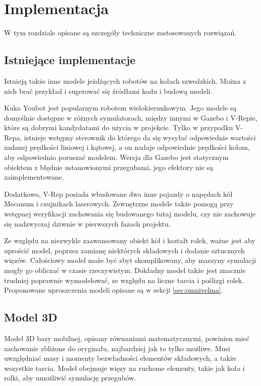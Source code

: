 \chapter{Implementacja} 
\label{sec:implementation}
W tym rozdziale opisane są szczegóły techniczne zastosowanych rozwiązań.

\section{Istniejące implementacje}
	Istnieją także inne modele jeżdżących robotów na kołach szwedzkich.
	Można z nich brać przykład i sugerować się źródłami kodu i budową modeli.

	Kuka Youbot jest popularnym robotem wielokierunkowym. Jego modele są domyślnie dostępne w różnych symulatorach, między innymi w Gazebo i V-Repie, które są dobrymi kandydatami do 
	użycia w projekcie. Tylko w przypadku V-Repa, istnieje wstępny sterownik do którego da się wysyłać odpowiednie wartości zadanej prędkości liniowej i kątowej, a on nadaje odpowiednie prędkości kołom, aby odpowiednio poruszać modelem.
	Wersja dla Gazebo jest statycznym obiektem z błędnie ustanowionymi przegubami, jego efektory nie są zaimplementowane.
	
	Dodatkowo, V-Rep posiada wbudowane dwa inne pojazdy o napędach kół Mecanum i czujnikach laserowych.
	Zewnętrzne modele także pomogą przy wstępnej weryfikacji zachowania się budowanego tutaj modelu, czy nie zachowuje się nadzwyczaj dziwnie w pierwszych fazach projektu.

	Ze względu na niezwykle zaawansowany obiekt kół i kształt rolek, ważne jest aby uprościć model, poprzez zamianę niektórych składowych i dodanie sztucznych więzów.
	Całościowy model może być zbyt skomplikowany, aby maszyny symulacji mogły go obliczać w czasie rzeczywistym.
	Dokładny model także jest znacznie trudniej poprawnie wymodelować, ze względu na liczne tarcia i poślizgi rolek.
	Proponowane uproszczenia modeli opisane są w sekcji \ref{sec:omnivelma}.
	
\section{Model 3D}
	Model 3D bazy mobilnej, opisany równaniami matematycznymi, powinien mieć zachowanie zbliżone do oryginału, najbardziej jak to tylko możliwe.
	Musi uwzględniać masy i momenty bezwładności elementów składowych, a także wszystkie tarcia.
	Model obejmuje więzy na ruchome elementy, takie jak koła i rolki, aby umożliwić symulację przegubów.

